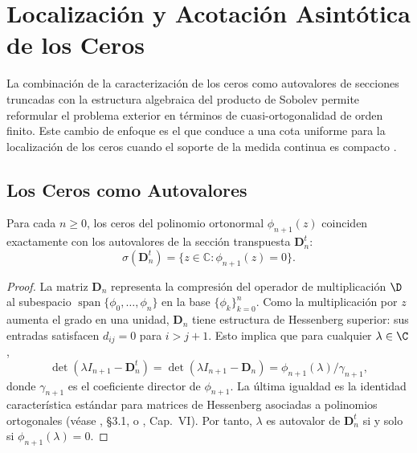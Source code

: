 
\chapter{Localización y Acotación Asintótica de los Ceros}\label{sec:ceros_acotacion}

La combinación de la caracterización de los ceros como autovalores de secciones truncadas con la estructura algebraica del producto de Sobolev permite reformular el problema exterior en términos de cuasi-ortogonalidad de orden finito. Este cambio de enfoque es el que conduce a una cota uniforme para la localización de los ceros cuando el soporte de la medida continua es compacto \cite{lopez1999zero,lopez2001sobolev,marcellan2015sobolev}.

\section{Los Ceros como Autovalores}

\begin{prop}\label{prop:autovalores_ceros}
	Para cada $n \ge 0$, los ceros del polinomio ortonormal $\phi_{n+1}(z)$ coinciden exactamente con los autovalores de la sección transpuesta $\mathbf{D}_n^t$:
	\[
		\sigma(\mathbf{D}_n^t) = \{z \in \mathbb{C} : \phi_{n+1}(z) = 0\}.
	\]
\end{prop}

\begin{proof}
	La matriz $\mathbf{D}_n$ representa la compresión del operador de multiplicación $\D$ al subespacio $\operatorname{span}\{\phi_0,\dots,\phi_n\}$ en la base $\{\phi_k\}_{k=0}^n$. Como la multiplicación por $z$ aumenta el grado en una unidad, $\mathbf{D}_n$ tiene estructura de Hessenberg superior: sus entradas satisfacen $d_{ij}=0$ para $i>j+1$. Esto implica que para cualquier $\lambda\in\C$,
	\[
		\det(\lambda I_{n+1}-\mathbf{D}_n^t)=\det(\lambda I_{n+1}-\mathbf{D}_n)
		=\phi_{n+1}(\lambda)/\gamma_{n+1},
	\]
	donde $\gamma_{n+1}$ es el coeficiente director de $\phi_{n+1}$. La última igualdad es la identidad característica estándar para matrices de Hessenberg asociadas a polinomios ortogonales (véase \cite{szego1975orthogonal}, §3.1, o \cite{gohberg1969introduction}, Cap.~VI). Por tanto, $\lambda$ es autovalor de $\mathbf{D}_n^t$ si y solo si $\phi_{n+1}(\lambda)=0$.
\end{proof}

